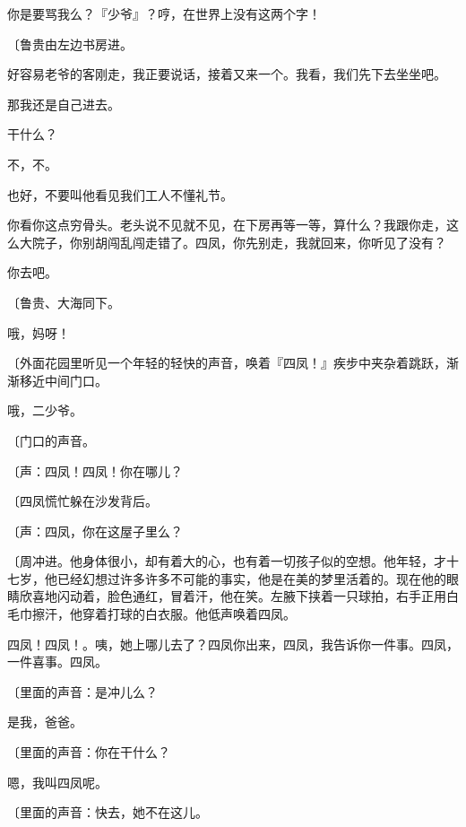 你是要骂我么？『少爷』？哼，在世界上没有这两个字！

{\fangsong〔鲁贵由左边书房进。}

好容易老爷的客刚走，我正要说话，接着又来一个。我看，我们先下去坐坐吧。

那我还是自己进去。

干什么？

不，不。

也好，不要叫他看见我们工人不懂礼节。

你看你这点穷骨头。老头说不见就不见，在下房再等一等，算什么？我跟你走，这么大院子，你别胡闯乱闯走错了。四凤，你先别走，我就回来，你听见了没有？

你去吧。

{\fangsong〔鲁贵、大海同下。}

哦，妈呀！

{\fangsong〔外面花园里听见一个年轻的轻快的声音，唤着『四凤！』疾步中夹杂着跳跃，渐渐移近中间门口。}

哦，二少爷。

{\fangsong〔门口的声音。}

{\fangsong〔声：四凤！四凤！你在哪儿？}

{\fangsong〔四凤慌忙躲在沙发背后。}

{\fangsong〔声：四凤，你在这屋子里么？}

{\fangsong〔周冲进。他身体很小，却有着大的心，也有着一切孩子似的空想。他年轻，才十七岁，他已经幻想过许多许多不可能的事实，他是在美的梦里活着的。现在他的眼睛欣喜地闪动着，脸色通红，冒着汗，他在笑。左腋下挟着一只球拍，右手正用白毛巾擦汗，他穿着打球的白衣服。他低声唤着四凤。}

四凤！四凤！。咦，她上哪儿去了？四凤你出来，四凤，我告诉你一件事。四凤，一件喜事。四凤。

{\fangsong〔里面的声音：是冲儿么？}

是我，爸爸。

{\fangsong〔里面的声音：你在干什么？}

嗯，我叫四凤呢。

{\fangsong〔里面的声音：快去，她不在这儿。}

